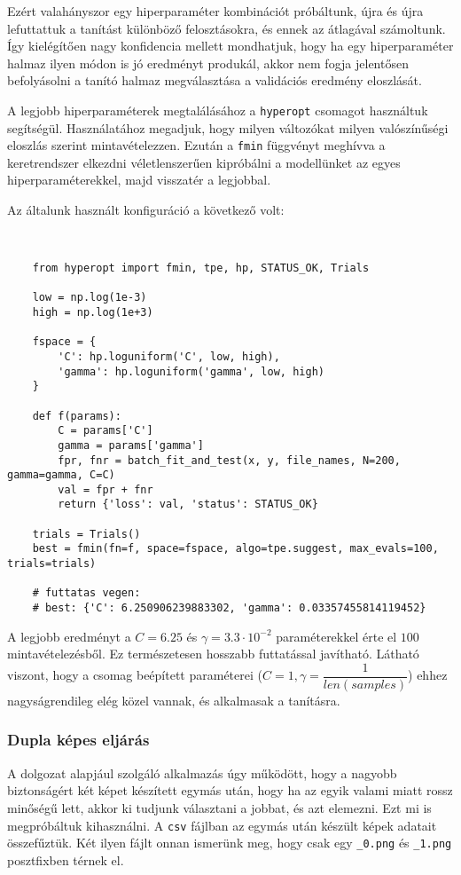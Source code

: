 Ezért valahányszor egy hiperparaméter kombinációt próbáltunk, újra és újra lefuttattuk a
tanítást különböző felosztásokra, és ennek az átlagával számoltunk. Így kielégítően nagy 
konfidencia mellett mondhatjuk, hogy ha egy hiperparaméter halmaz ilyen módon is jó eredményt
produkál, akkor nem fogja jelentősen befolyásolni a tanító halmaz megválasztása a validációs 
eredmény eloszlását.

A legjobb hiperparaméterek megtalálásához a \texttt{hyperopt} \cite{hyperopt} csomagot használtuk
segítségül. Használatához megadjuk, hogy milyen változókat milyen valószínűségi eloszlás szerint
mintavételezzen. Ezután a \texttt{fmin} függvényt meghívva a keretrendszer elkezdni véletlenszerűen
kipróbálni a modellünket az egyes hiperparaméterekkel, majd visszatér a legjobbal. 

Az általunk használt konfiguráció a következő volt:
\begin{lstlisting}


	from hyperopt import fmin, tpe, hp, STATUS_OK, Trials
	
	low = np.log(1e-3)
	high = np.log(1e+3)
	
	fspace = {	
		'C': hp.loguniform('C', low, high),
		'gamma': hp.loguniform('gamma', low, high)
	}
	
	def f(params):
		C = params['C']
		gamma = params['gamma']
		fpr, fnr = batch_fit_and_test(x, y, file_names, N=200, gamma=gamma, C=C)
		val = fpr + fnr
		return {'loss': val, 'status': STATUS_OK}
	
	trials = Trials()
	best = fmin(fn=f, space=fspace, algo=tpe.suggest, max_evals=100, trials=trials)
	
	# futtatas vegen:
	# best: {'C': 6.250906239883302, 'gamma': 0.03357455814119452}
\end{lstlisting}


A legjobb eredményt a $ C=6.25 $ és $ \gamma = 3.3 \cdot 10^{-2} $ paraméterekkel érte el $ 100 $
mintavételezésből. Ez természetesen hosszabb futtatással javítható. Látható viszont, hogy a csomag
beépített paraméterei ($ C=1 , \gamma =\dfrac{1}{len(samples)} $) ehhez nagyságrendileg elég közel vannak,
és alkalmasak a tanításra.


\subsubsection{Dupla képes eljárás}
\label{sec:dupla.kepes.eljaras}

A dolgozat alapjául szolgáló alkalmazás úgy működött, hogy a nagyobb biztonságért két képet készített
egymás után, hogy ha az egyik valami miatt rossz minőségű lett, akkor ki tudjunk választani a jobbat, 
és azt elemezni. Ezt mi is megpróbáltuk kihasználni. A \texttt{csv} fájlban az egymás után készült képek adatait
összefűztük. Két ilyen fájlt onnan ismerünk meg, hogy csak egy \texttt{\_0.png} és \texttt{\_1.png}
posztfixben térnek el.

